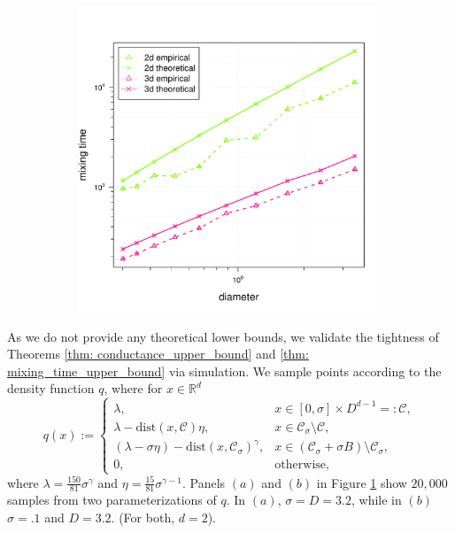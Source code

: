 \documentclass{article}
\newcommand{\Reals}{\mathbb{R}}
\newcommand{\Rd}{\Reals^d}
\newcommand{\1}{\mathbf{1}}
\newcommand{\dist}{\mathrm{dist}}
\newcommand{\Cset}{\mathcal{C}}
\newcommand{\Csig}{\Cset_{\sigma}}
\theoremstyle{aldenthm}
\theoremstyle{aldenrmrk}
\begin{document}
\begin{figure}
\begin{adjustbox}{minipage=\linewidth,scale=0.8}
\begin{subfigure}{.33\linewidth}
		\caption{}
	\end{subfigure}
	\begin{subfigure}{.33\linewidth}
		\includegraphics[width=\linewidth]{example1plots/diameter_mixing_time_plot}
		\caption{}
	\end{subfigure}
	\caption{}
	\label{fig:fig1}
	\end{adjustbox}
\end{figure}

As we do not provide any theoretical lower bounds, we validate the tightness of Theorems \ref{thm: conductance_upper_bound} and \ref{thm: mixing_time_upper_bound} via simulation.  We sample points according to the density function $q$, where for $x \in \Rd$
\begin{equation}
q(x) :=
\begin{cases}
\lambda,~ & x \in [0,\sigma] \times D^{d-1} =: \Cset, \\
\lambda - \dist(x,\Cset)\eta,~ & x \in \Csig \setminus \Cset, \\
(\lambda - \sigma \eta) - \dist(x,\Csig)^{\gamma}, & x \in (\Csig + \sigma B) \setminus \Csig, \\
0,~ & \textrm{otherwise},
\end{cases}
\end{equation}
where $\lambda = \frac{150}{81} \sigma^{\gamma}$ and $\eta = \frac{15}{81} \sigma^{\gamma - 1}$. Panels $(a)$ and $(b)$ in Figure \ref{fig:fig1} show $20,000$ samples from two parameterizations of $q$. In $(a)$, $\sigma = D = 3.2$, while in $(b)$ $\sigma = .1$ and $D = 3.2$. (For both, $d = 2$).
\end{document}
